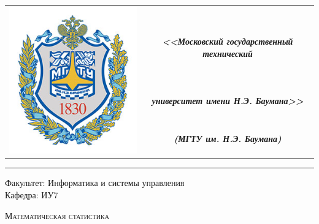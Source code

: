 \begin{titlepage}

    \begin{table}[H]
        \centering
        \begin{tabular}{cc}
            \multirow{4}{*}{\includegraphics[scale=0.3]{../bmstu.jpg}}
            & \\
            & \large \textit{\textbf{<<Московский государственный технический}} \\
            & \large \textit{\textbf{университет имени Н.Э. Баумана>>}}\\
            & \large \textit{\textbf{(МГТУ им. Н.Э. Баумана)}}\\
        \end{tabular}
    \end{table}

    \begin{flushleft}
        \rule{\textwidth}{3pt}
    \end{flushleft}

    \begin{flushleft}
        \Large
        Факультет: Информатика и системы управления \\
        Кафедра: ИУ7
    \end{flushleft}

    \vspace{2cm}

    \begin{center}
        \LARGE
        \textsc{Математическая статистика}
    \end{center}

    \vspace{3cm}

    \begin{center}
        \large


\end{center}
\end{titlepage}
